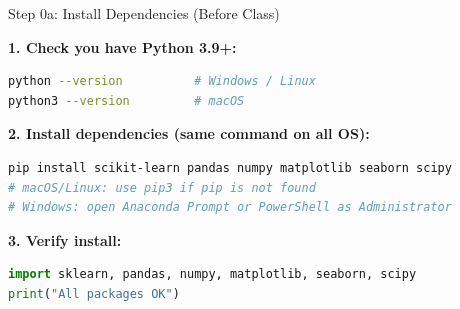 \documentclass[aspectratio=169,11pt]{beamer}
\begin{document}
\begin{frame}[fragile]{Step 0a: Install Dependencies (Before Class)}

    \vspace{0.15cm}
    \textbf{1. Check you have Python 3.9+:}
\begin{lstlisting}[language=bash]
python --version          # Windows / Linux
python3 --version         # macOS
\end{lstlisting}

    \vspace{0.1cm}
    \textbf{2. Install dependencies (same command on all OS):}
\begin{lstlisting}[language=bash]
pip install scikit-learn pandas numpy matplotlib seaborn scipy
# macOS/Linux: use pip3 if pip is not found
# Windows: open Anaconda Prompt or PowerShell as Administrator
\end{lstlisting}

    \vspace{0.1cm}
    \textbf{3. Verify install:}
\begin{lstlisting}[language=Python]
import sklearn, pandas, numpy, matplotlib, seaborn, scipy
print("All packages OK")
\end{lstlisting}

\end{frame}
\end{document}
